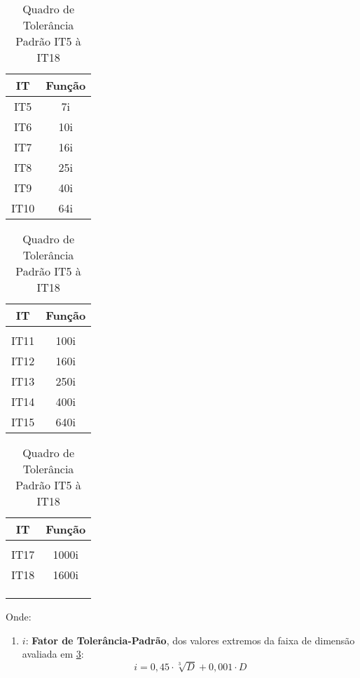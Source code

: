 \documentclass{article}
\begin{document}
                \begin{table}[H]
                    \centering
                    \begin{tabular}[]{c | c}\hline
                        IT   & Função \\[1mm]\hline
                        IT5  & 7i \\
                        IT6  & 10i\\
                        IT7  & 16i\\
                        IT8  & 25i\\
                        IT9  & 40i\\
                        IT10 & 64i\\\hline
                    \end{tabular}
                    \hspace{10mm}
                    \begin{tabular}[]{c | c}\hline
                        IT   & Função \\[1mm]\hline
                             & \\
                        IT11 & 100i\\
                        IT12 & 160i\\
                        IT13 & 250i\\
                        IT14 & 400i\\
                        IT15 & 640i\\\hline
                    \end{tabular}
                    \hspace{10mm}
                    \begin{tabular}[]{c | c}\hline
                        IT   & Função \\[1mm]\hline
                             & \\
                        IT17 & 1000i\\
                        IT18 & 1600i\\
                         & \\
                         & \\
                         & \\\hline
                    \end{tabular}
                    \caption{Quadro de Tolerância Padrão IT5 à IT18}\label{table:tolerance}
                \end{table}\noindent
            Onde:
                \begin{enumerate}[noitemsep]
                    \item $i$: \textbf{Fator de Tolerância-Padrão}, dos valores extremos da faixa de dimensão avaliada em \ref{table:tolerance}:
                        \begin{equation}
                            \boxed{
                                i = 0,45 \cdot \sqrt[3]{D} + 0,001 \cdot D
                            }
                        \end{equation}
                \end{enumerate}
\newpage
\end{document}
